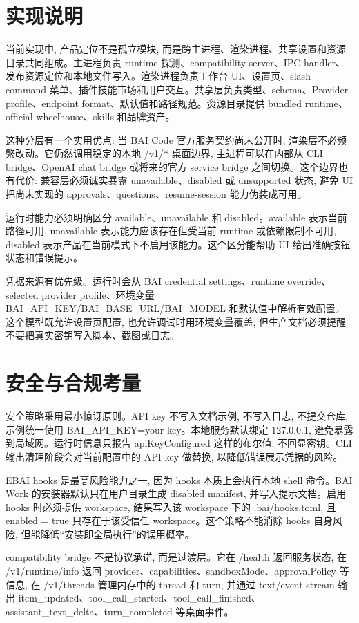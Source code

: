 \section{实现说明}
当前实现中, 产品定位不是孤立模块, 而是跨主进程、渲染进程、共享设置和资源目录共同组成。主进程负责 runtime 探测、compatibility server、IPC handler、发布资源定位和本地文件写入。渲染进程负责工作台 UI、设置页、slash command 菜单、插件技能市场和用户交互。共享层负责类型、schema、Provider profile、endpoint format、默认值和路径规范。资源目录提供 bundled runtime、official wheelhouse、skills 和品牌资产。

这种分层有一个实用优点: 当 BAI Code 官方服务契约尚未公开时, 渲染层不必频繁改动。它仍然调用稳定的本地 /v1/* 桌面边界, 主进程可以在内部从 CLI bridge、OpenAI chat bridge 或将来的官方 service bridge 之间切换。这个边界也有代价: 兼容层必须诚实暴露 unavailable、disabled 或 unsupported 状态, 避免 UI 把尚未实现的 approvals、questions、resume-session 能力伪装成可用。

运行时能力必须明确区分 available、unavailable 和 disabled。available 表示当前路径可用, unavailable 表示能力应该存在但受当前 runtime 或依赖限制不可用, disabled 表示产品在当前模式下不启用该能力。这个区分能帮助 UI 给出准确按钮状态和错误提示。

凭据来源有优先级。运行时会从 BAI credential settings、runtime override、selected provider profile、环境变量 BAI\_API\_KEY/BAI\_BASE\_URL/BAI\_MODEL 和默认值中解析有效配置。这个模型既允许设置页配置, 也允许调试时用环境变量覆盖, 但生产文档必须提醒不要把真实密钥写入脚本、截图或日志。

\section{安全与合规考量}
安全策略采用最小惊讶原则。API key 不写入文档示例, 不写入日志, 不提交仓库, 示例统一使用 BAI\_API\_KEY=your-key。本地服务默认绑定 127.0.0.1, 避免暴露到局域网。运行时信息只报告 apiKeyConfigured 这样的布尔值, 不回显密钥。CLI 输出清理阶段会对当前配置中的 API key 做替换, 以降低错误展示凭据的风险。

EBAI hooks 是最高风险能力之一, 因为 hooks 本质上会执行本地 shell 命令。BAI Work 的安装器默认只在用户目录生成 disabled manifest, 并写入提示文档。启用 hooks 时必须提供 workspace, 结果写入该 workspace 下的 .bai/hooks.toml, 且 enabled = true 只存在于该受信任 workspace。这个策略不能消除 hooks 自身风险, 但能降低“安装即全局执行”的误用概率。

compatibility bridge 不是协议承诺, 而是过渡层。它在 /health 返回服务状态, 在 /v1/runtime/info 返回 provider、capabilities、sandboxMode、approvalPolicy 等信息, 在 /v1/threads 管理内存中的 thread 和 turn, 并通过 text/event-stream 输出 item\_updated、tool\_call\_started、tool\_call\_finished、assistant\_text\_delta、turn\_completed 等桌面事件。

